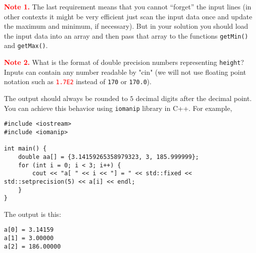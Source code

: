 \documentclass[11pt]{article}
\begin{document}
\textcolor{red}{\bf Note 1.} The last requirement means that you cannot ``forget'' the input lines
(in other contexts it might be very efficient \textendash{} just scan the input data once 
and update the maximum and minimum, if necessary). 
But in your solution you should load the input data into an array and then pass that array 
to the functions {\tt getMin()} and {\tt getMax()}. 

\textcolor{red}{\bf Note 2.} What is the format of double precision numbers representing {\tt height}?\\
Inputs can contain any number readable by "cin" (we will not use floating point 
notation such as \textcolor{red}{\tt 1.7E2} instead of {\tt 170} or {\tt 170.0}). 

The output should always be rounded to 
$5$ decimal digits after the decimal point. 
You can achieve this behavior using {\tt iomanip} library in C++. For example, 

\begin{Verbatim}
#include <iostream> 
#include <iomanip>

int main() {
    double aa[] = {3.14159265358979323, 3, 185.999999};
    for (int i = 0; i < 3; i++) {
        cout << "a[ " << i << "] = " << std::fixed << std::setprecision(5) << a[i] << endl;
    }
}
\end{Verbatim}

The output is this: 

\begin{Verbatim}
a[0] = 3.14159
a[1] = 3.00000
a[2] = 186.00000
\end{Verbatim}
\end{document}

